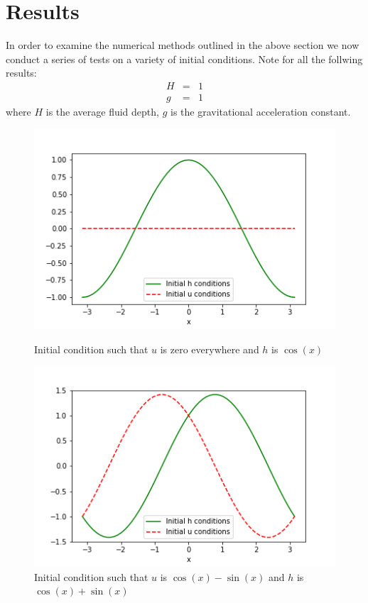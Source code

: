 \documentclass[a4paper,12pt, notitlepage]{article}
\begin{document}
\section{Results}\label{resultssection}
In order to examine the numerical methods outlined in the above section we now conduct a series of tests on a variety of initial conditions. Note for all the follwing results:
\begin{eqnarray}
H & = & 1\\
g & = & 1
\end{eqnarray}
where $H$ is the average fluid depth, $g$ is the gravitational acceleration constant.

\renewcommand\theContinuedFloat{\alph{ContinuedFloat}}
\begin{figure}[H]
	\begin{minipage}{.5\textwidth}
	\ContinuedFloat*
	\captionsetup{width=0.9\textwidth}
	\captionsetup{justification=centering}
	\includegraphics[width=\textwidth]{initial_condition_cos.png}
	\caption{\label{initialconditioncos}Initial condition such that $u$ is zero everywhere and $h$ is $\cos(x)$}
\end{minipage}
	\begin{minipage}{.5\textwidth}
	\ContinuedFloat
	\captionsetup{width=0.9\textwidth}
	\captionsetup{justification=centering}
	\includegraphics[width=\textwidth]{initial_condition_cossin.png}
	\caption{\label{initialconditioncossin}Initial condition such that $u$ is $\cos(x) - \sin(x)$ and $h$ is $\cos(x) + \sin(x)$}
\end{minipage}
\end{figure}
\end{document}
